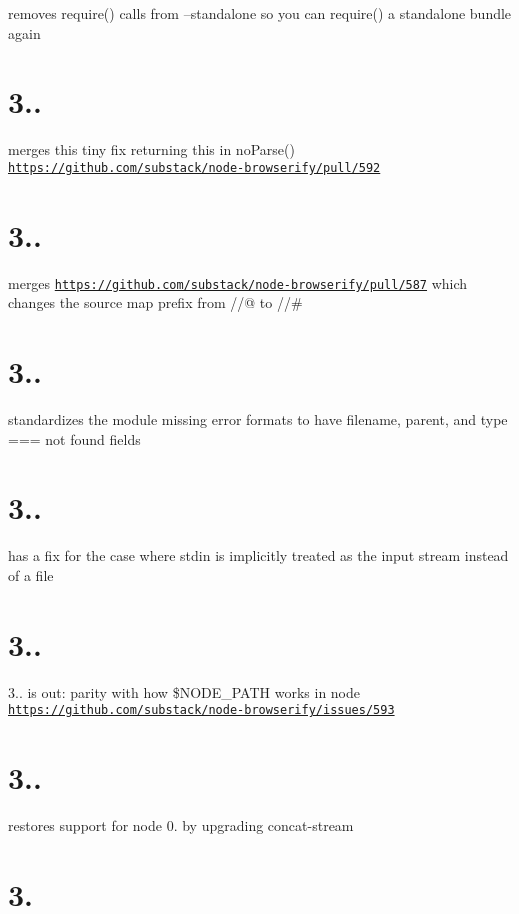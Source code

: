 removes require() calls from --standalone so you can require() a standalone bundle again

\section*{3..}

merges this tiny fix returning {\ttfamily this} in no\+Parse() \href{https://github.com/substack/node-browserify/pull/592}{\tt https\+://github.\+com/substack/node-\/browserify/pull/592}

\section*{3..}

merges \href{https://github.com/substack/node-browserify/pull/587}{\tt https\+://github.\+com/substack/node-\/browserify/pull/587} which changes the source map prefix from //@ to //\#

\section*{3..}

standardizes the module missing error formats to have filename, parent, and type === \textquotesingle{}not found\textquotesingle{} fields

\section*{3..}

has a fix for the case where stdin is implicitly treated as the input stream instead of a file

\section*{3..}

3.. is out\+: parity with how \$\+N\+O\+D\+E\+\_\+\+P\+A\+TH works in node \href{https://github.com/substack/node-browserify/issues/593}{\tt https\+://github.\+com/substack/node-\/browserify/issues/593}

\section*{3..}

restores support for node 0. by upgrading concat-\/stream

\section*{3.}

